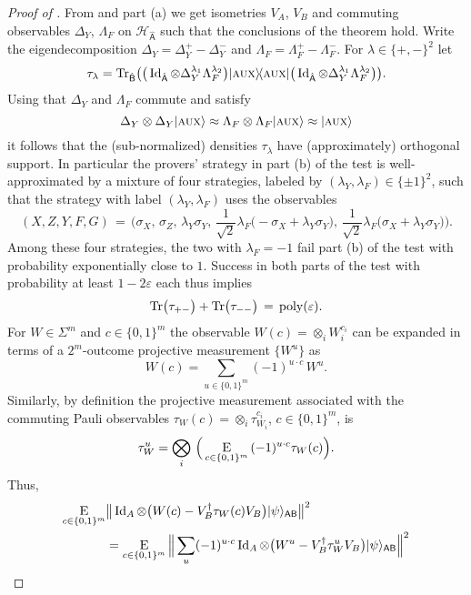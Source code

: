 \documentclass{toc}
\newcommand{\ket}[1]{|#1\rangle}
\newcommand{\bra}[1]{\langle#1|}
\newcommand{\proj}[1]{\ket{#1}\!\bra{#1}}
\newcommand{\Tr}{\mbox{\rm Tr}}
\newcommand{\Id}{\ensuremath{\mathop{\rm Id}\nolimits}}
\newcommand{\Es}[1]{\ensuremath{\mathop{\textsc{E}}}_{#1}} %
\DeclareMathOperator{\poly}{poly}
\newcommand{\reg}[1]{{\textsf{#1}}}
\newcommand{\mH}{\mathcal{H}}
\newcommand{\eps}{\varepsilon}
\newcommand{\aux}{\textsc {aux}}
\newcommand{\phase}{\Lambda}
\begin{document}
\begin{proof}[Proof of ]
From  and part (a) we get isometries $V_A$, $V_B$ and commuting observables $\Delta_Y$, $\phase_F$ on ${\mH}_{\hat{\reg{A}}}$ such that the conclusions of the theorem hold. Write the eigendecomposition $\Delta_Y = \Delta_Y^{+}-\Delta_Y^{-}$ and $\phase_F = \phase_F^{+}-\phase_F^{-}$. For $\lambda \in \{+,-\}^2$ let
$$\tau_{\lambda} = \Tr_{\hat{\reg{B}}}\big( \big(\Id_{\hat{\reg{A}}}\otimes \Delta_Y^{\lambda_1}\phase_F^{\lambda_2} \big)\proj{\aux}\big(\Id_{\hat{\reg{A}}}\otimes \Delta_Y^{\lambda_1}\phase_F^{\lambda_2}\big)\big).$$ 
Using that $\Delta_Y$ and $\phase_F$ commute and satisfy 
$$\Delta_Y \otimes \Delta_Y \ket{\aux} \approx \phase_F\otimes \phase_F \ket{\aux} \approx \ket{\aux}$$
 it follows that the (sub-normalized) densities $\tau_{\lambda}$ have (approximately) orthogonal support. In particular the provers' strategy in part (b) of the test is well-approximated by a mixture of four strategies, labeled by $(\lambda_Y,\lambda_F)\in\{\pm 1\}^2$, such that the strategy with label $(\lambda_Y,\lambda_F)$ uses the observables 
$$(X,Z,Y,F,G)\,=\,\Big(\sigma_X,\,\sigma_Z,\,\lambda_Y\sigma_Y,\,\frac{1}{\sqrt{2}}\lambda_F\big(-\sigma_X + \lambda_Y\sigma_Y\big),\,\frac{1}{\sqrt{2}}\lambda_F\big(\sigma_X + \lambda_Y\sigma_Y\big)\Big).$$ 
Among these four strategies, the two with $\lambda_F=-1$ fail part (b) of the test with probability exponentially close to $1$. Success in both parts of the test with probability at least $1-2\eps$ each thus implies
\begin{equation}\label{eq:tau-bound}
\Tr\big(\tau_{+-}\big)+\Tr\big(\tau_{--}\big) \,=\, \poly(\eps).
\end{equation} 
For $W\in \Sigma^{m}$ and $c\in \{0,1\}^m$ the observable $W(c) = \otimes_i W_{i}^{c_i}$ can be expanded in terms of a $2^m$-outcome projective measurement $\{W^{u}\}$ as 
$$W(c) = \sum_{u\in \{0,1\}^m}  (-1)^{u\cdot c} \,W^{u}.$$
Similarly, by definition the projective measurement associated with the commuting Pauli observables $\tau_W(c) = \otimes_i \tau_{W_{i}}^{c_i}$, $c\in\{0,1\}^m$, is 
$$\tau_W^{u} = \bigotimes_i \,\Big(\Es{c\in \{0,1\}^m} \,(-1)^{u \cdot c} \tau_W(c)\Big).$$ 
Thus,
\begin{align}
\Es{c\in\{0,1\}^m} & \big\| \Id_A \otimes \big(  W(c) - V_B^\dagger \tau_{W}(c) V_B\big)   \ket{\psi}_{\reg{AB}} \big\|^2\notag\\
&= \Es{c\in\{0,1\}^m}\Big\| \sum_{u} (-1)^{u\cdot c} \Id_A \otimes \big(  W^{u} - V_B^\dagger\tau_{W}^{u} V_B\big)   \ket{\psi}_{\reg{AB}} \Big\|^2    \notag\\

\end{align}
\end{proof}
\end{document}
